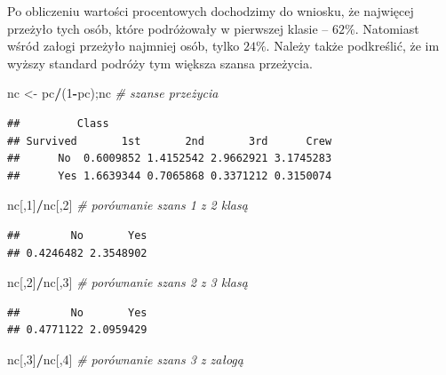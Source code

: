 \documentclass[polish,]{book}
\newenvironment{Shaded}{\begin{snugshade}}{\end{snugshade}}
\newcommand{\CommentTok}[1]{\textcolor[rgb]{0.56,0.35,0.01}{\textit{#1}}}
\newcommand{\DecValTok}[1]{\textcolor[rgb]{0.00,0.00,0.81}{#1}}
\newcommand{\NormalTok}[1]{#1}
\newcommand{\OperatorTok}[1]{\textcolor[rgb]{0.81,0.36,0.00}{\textbf{#1}}}
\newcommand{\StringTok}[1]{\textcolor[rgb]{0.31,0.60,0.02}{#1}}
\begin{document}
Po obliczeniu wartości procentowych dochodzimy do wniosku, że najwięcej przeżyło
tych osób, które podróżowały w pierwszej klasie -- \(62\%\). Natomiast wśród załogi
przeżyło najmniej osób, tylko \(24\%\). Należy także podkreślić, że im wyższy standard podróży tym większa szansa przeżycia.

\begin{Shaded}
\begin{Highlighting}[]
\NormalTok{nc <-}\StringTok{ }\NormalTok{pc}\OperatorTok{/}\NormalTok{(}\DecValTok{1}\OperatorTok{-}\NormalTok{pc);nc }\CommentTok{# szanse przeżycia}
\end{Highlighting}
\end{Shaded}

\begin{verbatim}
##         Class
## Survived       1st       2nd       3rd      Crew
##      No  0.6009852 1.4152542 2.9662921 3.1745283
##      Yes 1.6639344 0.7065868 0.3371212 0.3150074
\end{verbatim}

\begin{Shaded}
\begin{Highlighting}[]
\NormalTok{nc[,}\DecValTok{1}\NormalTok{]}\OperatorTok{/}\NormalTok{nc[,}\DecValTok{2}\NormalTok{]      }\CommentTok{# porównanie szans 1 z 2 klasą}
\end{Highlighting}
\end{Shaded}

\begin{verbatim}
##        No       Yes 
## 0.4246482 2.3548902
\end{verbatim}

\begin{Shaded}
\begin{Highlighting}[]
\NormalTok{nc[,}\DecValTok{2}\NormalTok{]}\OperatorTok{/}\NormalTok{nc[,}\DecValTok{3}\NormalTok{]      }\CommentTok{# porównanie szans 2 z 3 klasą}
\end{Highlighting}
\end{Shaded}

\begin{verbatim}
##        No       Yes 
## 0.4771122 2.0959429
\end{verbatim}

\begin{Shaded}
\begin{Highlighting}[]
\NormalTok{nc[,}\DecValTok{3}\NormalTok{]}\OperatorTok{/}\NormalTok{nc[,}\DecValTok{4}\NormalTok{]      }\CommentTok{# porównanie szans 3 z załogą}
\end{Highlighting}
\end{Shaded}
\end{document}
